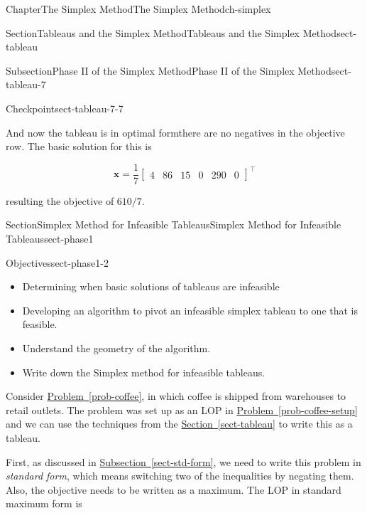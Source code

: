 \documentclass[oneside,10pt,]{book}
\newcommand{\xreffont}{\relax}
\numberwithin{equation}{section}
\newcommand{\amp}{&}
\begin{document}
\begin{chapterptx}{Chapter}{The Simplex Method}{}{The Simplex Method}{}{}{ch-simplex}
\begin{sectionptx}{Section}{Tableaus and the Simplex Method}{}{Tableaus and the Simplex Method}{}{}{sect-tableau}
\begin{subsectionptx}{Subsection}{Phase II of the Simplex Method}{}{Phase II of the Simplex Method}{}{}{sect-tableau-7}
\begin{inlineexercise}{Checkpoint}{}{sect-tableau-7-7}
\begin{equation*}
\end{equation*}
%
\par
And now the tableau is in optimal form\textemdash{}there are no negatives in the objective row. The basic solution for this is%
\par
%
\begin{equation*}
\boldsymbol{x} = \frac{1}{7} \left[ \begin{array}{rr|rrrr} 4 \amp 86 \amp 15 \amp 0 \amp 290 \amp 0 \end{array}\right]^{\intercal}
\end{equation*}
%
\par
resulting the objective of \(610/7\).%
\end{inlineexercise}%
%
\end{subsectionptx}
\end{sectionptx}
%
%
\typeout{************************************************}
\typeout{************************************************}
%
\begin{sectionptx}{Section}{Simplex Method for Infeasible Tableaus}{}{Simplex Method for Infeasible Tableaus}{}{}{sect-phase1}
\begin{objectives}{Objectives}{sect-phase1-2}
%
\begin{itemize}[label=\textbullet]
\item{}Determining when basic solutions of tableaus are infeasible%
\item{}Developing an algorithm to pivot an infeasible simplex tableau to one that is feasible.%
\item{}Understand the geometry of the algorithm.%
\item{}Write down the Simplex method for infeasible tableaus.%
\end{itemize}
\end{objectives}
\begin{introduction}{}%
Consider \hyperref[prob-coffee]{Problem~{\xreffont\ref{prob-coffee}}}, in which coffee is shipped from warehouses to retail outlets. The problem was set up as an LOP in \hyperref[prob-coffee-setup]{Problem~{\xreffont\ref{prob-coffee-setup}}} and we can use the techniques from the \hyperref[sect-tableau]{Section~{\xreffont\ref{sect-tableau}}} to write this as a tableau.%
\par
First, as discussed in \hyperref[sect-std-form]{Subsection~{\xreffont\ref{sect-std-form}}}, we need to write this problem in \emph{standard form}, which means switching two of the inequalities by negating them. Also, the objective needs to be written as a maximum. The LOP in standard maximum form is%

\end{introduction}
\end{sectionptx}
\end{chapterptx}
\end{document}
